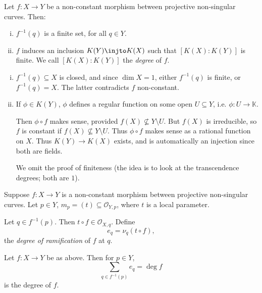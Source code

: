 \documentclass[12pt]{article}
\begin{document}
\begin{proposition}
	Let $f : X \to Y$ be a non-constant morphism between projective non-singular curves. Then:
	\begin{enumerate}[(i)]
		\item $f^{-1}(q)$ is a finite set, for all $q \in Y$.
		\item $f$ induces an inclusion $K(Y) \injto K(X)$ such that $[K(X):K(Y)]$ is finite. We call $[K(X): K(Y)]$ the \emph{degree} of $f$.
	\end{enumerate}
\end{proposition}

\begin{proofbox}
	
	\begin{enumerate}[(i)]
		\item $f^{-1}(q) \subseteq X$ is closed, and since $\dim X = 1$, either $f^{-1}(q)$ is finite, or $f^{-1}(q) = X$. The latter contradicts $f$ non-constant.
		\item If $\phi \in K(Y)$, $\phi$ defines a regular function on some open $U \subseteq Y$, i.e. $\phi : U \to \mathbb{K}$.

			Then $\phi \circ f$ makes sense, provided $f(X) \not \subseteq Y \setminus U$. But $f(X)$ is irreducible, so $f$ is constant if $f(X) \not \subseteq Y \setminus U$. Thus $\phi \circ f$ makes sense as a rational function on $X$. Thus $K(Y) \to K(X)$ exists, and is automatically an injection since both are fields.

			We omit the proof of finiteness (the idea is to look at the transcendence degrees; both are $1$).
	\end{enumerate}
\end{proofbox}

\begin{definition}
	Suppose $f : X \to Y$ is a non-constant morphism between projective non-singular curves. Let $p \in Y$, $m_p = (t) \subseteq \mathcal{O}_{Y, p}$, where $t$ is a local parameter.

	Let $q \in f^{-1}(p)$. Then $t \circ f \in \mathcal{O}_{X, q}$. Define
	\[
	e_q = \nu_q(t \circ f),
	\]
	the \emph{degree of ramification} of $f$ at $q$.
\end{definition}

\begin{theorem}
	Let $f : X \to Y$ be as above. Then for $p \in Y$,
	\[
	\sum_{q \in f^{-1}(p)} e_q = \deg f
	\]
	is the degree of $f$.
\end{theorem}
\end{document}
